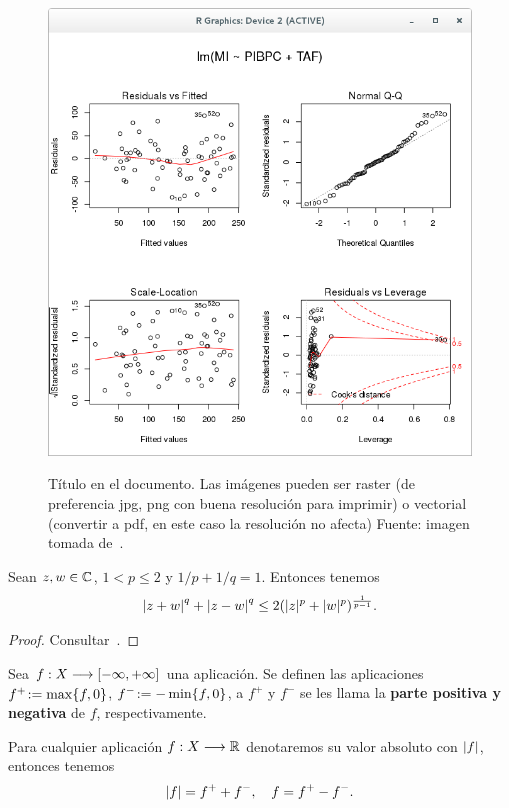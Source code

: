 \begin{figure}[ht]
\centering
\label{fig:analisisGraficoModelo3}
\includegraphics[width=0.9\linewidth]{analisisGraficoModelo3}\\
\caption[Titulo en el índice de figuras (opcional)]{Título en el 
documento. Las imágenes pueden ser raster (de preferencia jpg, png 
con buena resolución para imprimir) o vectorial (convertir a pdf, en 
este caso la resolución no afecta) Fuente: imagen tomada de~\cite{liu}.}
\end{figure}


\begin{lem}\label{lmcp11}Sean $z,w \in \mathbb{C}$, $1 < p \leq 2$ y $1/p +
1/q = 1$. Entonces tenemos \[\left\vert z+w\right\vert^q + \left\vert z-w\right\vert^q \leq 2 (|z|^p
+ |w|^p)^{\frac{1}{p-1}}.\]
\end{lem}

\begin{proof} Consultar~\cite[p. 227]{Hewit}. \end{proof}

\begin{defn}\label{dfcp5}Sea $f:X\longrightarrow [-\infty,+\infty]$ una aplicación. Se definen
las aplicaciones $f^+\!:=\max\{f,0\}$, $f^-\!:=-\min\{f,0\}$, a
$f^+$ y $f^-$ se les llama la \textbf{parte positiva y negativa} de
$f$, respectivamente.
\end{defn}


\begin{prp}\label{prcp2}Para cualquier aplicación $f:X\longrightarrow \mathbb{R}$
denotaremos su valor absoluto con $\left\vert f\right\vert$, entonces tenemos
\[\left\vert f\right\vert=f^++f^-,\quad f=f^+-f^-.\]
\end{prp}

